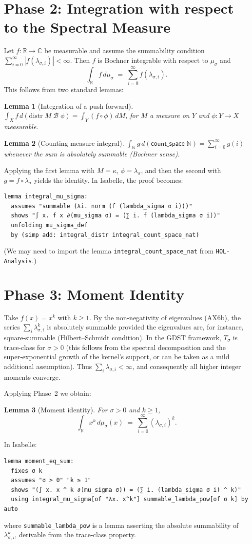 \documentclass[12pt,a4paper]{article}
\newtheorem{lemma}{Lemma}[section]
\begin{document}
\section{Phase 2: Integration with respect to the Spectral Measure}
Let $f:\mathbb{R}\to\mathbb{C}$ be measurable and assume the summability condition 
$\sum_{i=0}^\infty |f(\lambda_{\sigma,i})| < \infty$. Then $f$ is Bochner integrable with 
respect to $\mu_\sigma$ and
\[
\int_{\mathbb{R}} f \, d\mu_\sigma \;=\; \sum_{i=0}^\infty f(\lambda_{\sigma,i}).
\]
This follows from two standard lemmas:
\begin{lemma}[Integration of a push‑forward]
$\displaystyle \int_X f \, d(\mathrm{distr}\;M\; \mathcal{B}\; \phi) =
\int_Y (f \circ \phi) \, dM$, for $M$ a measure on $Y$ and $\phi:Y\to X$ measurable.
\end{lemma}
\begin{lemma}[Counting measure integral]
$\displaystyle \int_{\mathbb{N}} g \, d(\mathsf{count\_space}\; \mathbb{N}) =
\sum_{i=0}^\infty g(i)$ whenever the sum is absolutely summable (Bochner sense).
\end{lemma}
Applying the first lemma with $M = \kappa$, $\phi = \lambda_\sigma$, and then the second 
with $g = f \circ \lambda_\sigma$ yields the identity.  In Isabelle, the proof becomes:
\begin{verbatim}
lemma integral_mu_sigma:
  assumes "summable (λi. norm (f (lambda_sigma σ i)))"
  shows "∫ x. f x ∂(mu_sigma σ) = (∑ i. f (lambda_sigma σ i))"
  unfolding mu_sigma_def
  by (simp add: integral_distr integral_count_space_nat)
\end{verbatim}
(We may need to import the lemma \texttt{integral\_count\_space\_nat} from \texttt{HOL-Analysis}.)

\section{Phase 3: Moment Identity}
Take $f(x)=x^k$ with $k\ge 1$.  By the non‑negativity of eigenvalues (AX6b), the series 
$\sum_i \lambda_{\sigma,i}^k$ is absolutely summable provided the eigenvalues are, for instance, 
square‑summable (Hilbert–Schmidt condition).  In the GDST framework, $T_\sigma$ is trace‑class 
for $\sigma>0$ (this follows from the spectral decomposition and the super‑exponential growth 
of the kernel’s support, or can be taken as a mild additional assumption).  Thus 
$\sum_i \lambda_{\sigma,i} < \infty$, and consequently all higher integer moments converge.  

Applying Phase~2 we obtain:
\begin{lemma}[Moment identity]
For $\sigma>0$ and $k\ge 1$,
\[
\int_{\mathbb{R}} x^k \, d\mu_\sigma(x) \;=\; \sum_{i=0}^\infty (\lambda_{\sigma,i})^k .
\]
\end{lemma}
In Isabelle:
\begin{verbatim}
lemma moment_eq_sum:
  fixes σ k
  assumes "σ > 0" "k ≥ 1"
  shows "(∫ x. x ^ k ∂(mu_sigma σ)) = (∑ i. (lambda_sigma σ i) ^ k)"
  using integral_mu_sigma[of "λx. x^k"] summable_lambda_pow[of σ k] by auto
\end{verbatim}
where \texttt{summable\_lambda\_pow} is a lemma asserting the absolute summability of 
$\lambda_{\sigma,i}^k$, derivable from the trace‑class property.
\end{document}
